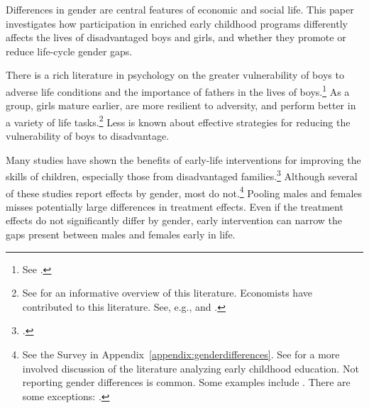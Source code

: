 Differences in gender are central features of economic and social life. This paper investigates how participation in enriched early childhood programs differently affects the lives of disadvantaged boys and girls, and whether they promote or reduce life-cycle gender gaps.

There is a rich literature in psychology on the greater vulnerability of boys to adverse life conditions and the importance of fathers in the lives of boys.\footnote{See \citet{golding2016psychology}.} As a group, girls mature earlier, are more resilient to adversity, and perform better in a variety of life tasks.\footnote{See \cite{Schore_2017_IMHJ} for an informative overview of this literature. Economists have contributed to this literature. See, e.g., \cite{Bertrand_Pan_2013_AEJAE,Autor-etal_2015_Family-Disadvantage} and \cite{Kottelenberg-Lehrer_2014_Gender-Effects}.} Less is known about effective strategies for reducing the vulnerability of boys to disadvantage.

Many studies have shown the benefits of early-life interventions for improving the skills of children, especially those from disadvantaged families.\footnote{\citet{Currie_2011_AER,Elango_Hojman_etal_2016_Early-Edu}.} Although several of these studies report effects by gender, most do not.\footnote{See the Survey in Appendix~\ref{appendix:genderdifferences}. See \citet{Elango_Hojman_etal_2016_Early-Edu} for a more involved discussion of the literature analyzing early childhood education. Not reporting gender differences is common. Some examples include \citet{Bernal_Keane_2011_JoLE,Cascio_Schanzenbach_2013_ImpactsExpandingAccess,Bitler_et_al_2014_Head_Start_Unpublished,Kline_Walters_2016_QJE}. There are some exceptions: \citet{Heckman_Moon_etal_2010_QE,Campbell_Conti_etal_2014_EarlyChildhoodInvestments,Garcia_Heckman_Leaf_etal_2017_Comp_CBA_Unpublished}.} Pooling males and females misses potentially large differences in treatment effects. Even if the treatment effects do not significantly differ by gender, early intervention can narrow the gaps present between males and females early in life.

